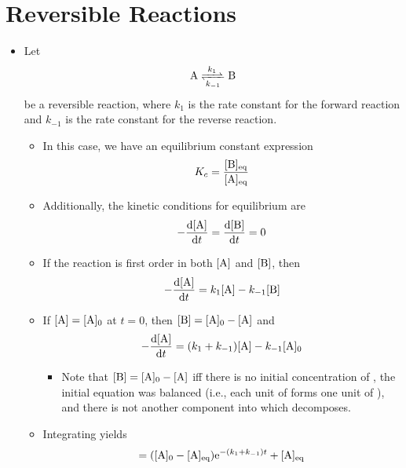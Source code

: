 \documentclass[../notes.tex]{subfiles}
\begin{document}
\section{Reversible Reactions}
\begin{itemize}
    \item {}Let
    \begin{equation*}
        \ce{A <=>[$k_1$][$k_{-1}$] B}
    \end{equation*}
    be a reversible reaction, where $k_1$ is the rate constant for the forward reaction and $k_{-1}$ is the rate constant for the reverse reaction.
    \begin{itemize}
        \item In this case, we have an equilibrium constant expression
        \begin{equation*}
            K_c = \frac{[\ce{B}]_\text{eq}}{[\ce{A}]_\text{eq}}
        \end{equation*}
        \item Additionally, the kinetic conditions for equilibrium are
        \begin{equation*}
            -\dv{[\ce{A}]}{t} = \dv{[\ce{B}]}{t} = 0
        \end{equation*}
        \item If the reaction is first order in both $[\ce{A}]$ and $[\ce{B}]$, then
        \begin{equation*}
            -\dv{[\ce{A}]}{t} = k_1[\ce{A}]-k_{-1}[\ce{B}]
        \end{equation*}
        \item If $[\ce{A}]=[\ce{A}]_0$ at $t=0$, then $[\ce{B}]=[\ce{A}]_0-[\ce{A}]$ and
        \begin{equation*}
            -\dv{[\ce{A}]}{t} = (k_1+k_{-1})[\ce{A}]-k_{-1}[\ce{A}]_0
        \end{equation*}
        \begin{itemize}
            \item Note that $[\ce{B}]=[\ce{A}]_0-[\ce{A}]$ iff there is no initial concentration of , the initial equation was balanced (i.e., each unit of  forms one unit of ), and there is not another component  into which  decomposes.
        \end{itemize}
        \item Integrating yields
        \begin{equation*}
            [\ce{A}] = ([\ce{A}]_0-[\ce{A}]_\text{eq})\e[-(k_1+k_{-1})t]+[\ce{A}]_\text{eq}
        \end{equation*}

\end{itemize}
\end{itemize}
\end{document}
